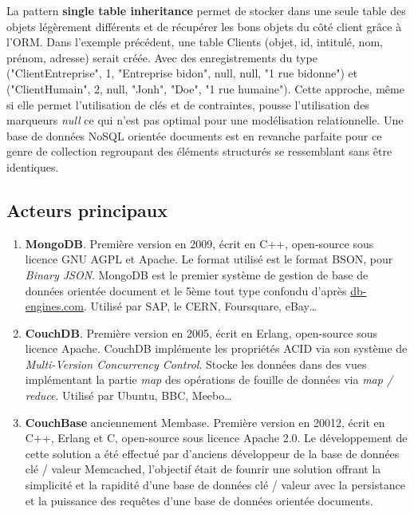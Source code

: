   La pattern \textbf{single table inheritance} permet de stocker dans une seule table des objets légèrement différents et de récupérer les bons objets du côté client grâce à l'ORM. Dans l'exemple précédent, une table Clients (objet, id, intitulé, nom, prénom, adresse) serait créée. Avec des enregistrements du type ("ClientEntreprise", 1, "Entreprise bidon", null, null, "1 rue bidonne") et ("ClientHumain", 2, null, "Jonh", "Doe", "1 rue humaine"). Cette approche, même si elle permet l'utilisation de clés et de contraintes, pousse l'utilisation des marqueurs \textit{null} ce qui n'est pas optimal pour une modélisation relationnelle. Une base de données NoSQL orientée documents est en revanche parfaite pour ce genre de collection regroupant des éléments structurés se ressemblant sans être identiques.

\subsection{Acteurs principaux}

  \begin{enumerate}
    \item \textbf{MongoDB}. Première version en 2009, écrit en C++, open-source sous licence GNU AGPL et Apache. Le format utilisé est le format BSON, pour \textit{Binary JSON}. MongoDB est le premier système de gestion de base de données orientée document et le 5ème tout type confondu d'après \url{db-engines.com}. Utilisé par SAP, le CERN, Foursquare, eBay\dots\cite{Wikipedia_mongodb}
    \item \textbf{CouchDB}. Première version en 2005, écrit en Erlang, open-source sous licence Apache. CouchDB implémente les propriétés ACID via son système de \textit{Multi-Version Concurrency Control}. Stocke les données dans des vues implémentant la partie \textit{map} des opérations de fouille de données via \textit{map / reduce}. Utilisé par Ubuntu, BBC, Meebo\dots\cite{Wikipedia_couchdb}
    \item \textbf{CouchBase} anciennement Membase. Première version en 20012, écrit en C++, Erlang et C, open-source sous licence Apache 2.0. Le développement de cette solution a été effectué par d'anciens développeur de la base de données clé / valeur Memcached, l'objectif était de founrir une solution offrant la simplicité et la rapidité d'une base de données clé / valeur avec la persistance et la puissance des requêtes d'une base de données orientée documents.\cite{Wikipedia_couchbase}
  \end{enumerate}

